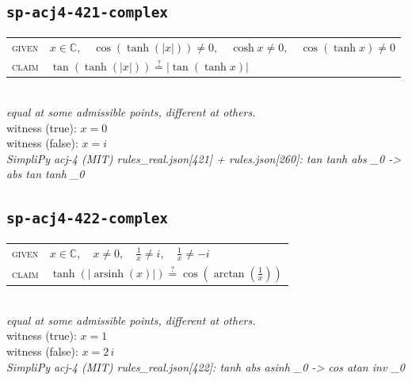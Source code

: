 \documentclass[11pt]{article}
\begin{document}
\subsection*{\texttt{sp-acj4-421-complex}}
\begin{tabular}{@{}l@{\quad}l@{}}
\textsc{given} & $x \in \mathbb{C},\quad \cos\left(\tanh\left(\left|x\right|\right)\right) \neq 0,\quad \cosh x \neq 0,\quad \cos\left(\tanh x\right) \neq 0$ \\[4pt]
\textsc{claim} & $\displaystyle \tan\left(\tanh\left(\left|x\right|\right)\right) \overset{?}{=} \left|\tan\left(\tanh x\right)\right|$ \\
\end{tabular}\\[2pt]
{\small\emph{equal at some admissible points, different at others.}}\\
{\footnotesize\color{gray}witness (true): $x = 0$}\\
{\footnotesize\color{gray}witness (false): $x = i$}\\
\emph{SimpliPy acj-4 (MIT) rules\_real.json[421] + rules.json[260]: tan tanh abs \_0  ->  abs tan tanh \_0}\\

\subsection*{\texttt{sp-acj4-422-complex}}
\begin{tabular}{@{}l@{\quad}l@{}}
\textsc{given} & $x \in \mathbb{C},\quad x \neq 0,\quad \frac{1}{x} \neq i,\quad \frac{1}{x} \neq -i$ \\[4pt]
\textsc{claim} & $\displaystyle \tanh\left(\left|\operatorname{arsinh}\left(x\right)\right|\right) \overset{?}{=} \cos\left(\arctan\left(\frac{1}{x}\right)\right)$ \\
\end{tabular}\\[2pt]
{\small\emph{equal at some admissible points, different at others.}}\\
{\footnotesize\color{gray}witness (true): $x = 1$}\\
{\footnotesize\color{gray}witness (false): $x = 2 \, i$}\\
\emph{SimpliPy acj-4 (MIT) rules\_real.json[422]: tanh abs asinh \_0  ->  cos atan inv \_0}\\
\end{document}
